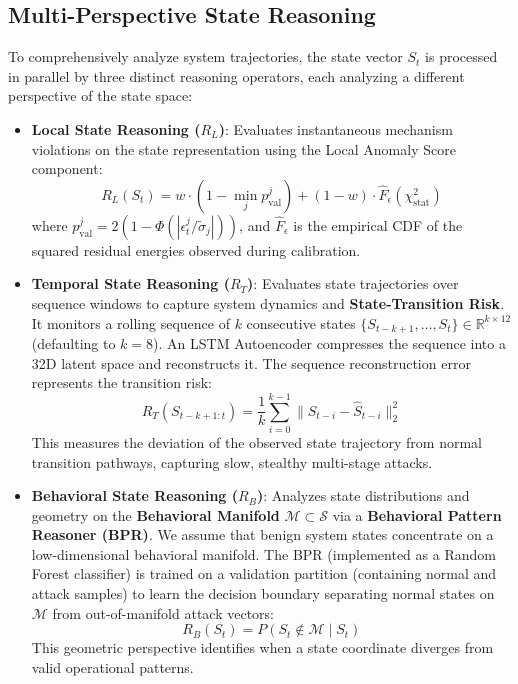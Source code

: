 \subsection{Multi-Perspective State Reasoning}
To comprehensively analyze system trajectories, the state vector $S_t$ is processed in parallel by three distinct reasoning operators, each analyzing a different perspective of the state space:
\begin{itemize}
\item \textbf{Local State Reasoning ($R_L$)}: Evaluates instantaneous mechanism violations on the state representation using the Local Anomaly Score component:
\begin{equation}
R_L(S_t) = w \cdot (1 - \min_j p_{\text{val}}^j) + (1-w) \cdot \hat{F}_{\epsilon}(\chi^2_{\text{stat}})
\end{equation}
where $p_{\text{val}}^j = 2(1 - \Phi(|\epsilon^j_t/\tilde{\sigma}_j|))$, and $\hat{F}_{\epsilon}$ is the empirical CDF of the squared residual energies observed during calibration.
\item \textbf{Temporal State Reasoning ($R_T$)}: Evaluates state trajectories over sequence windows to capture system dynamics and \textbf{State-Transition Risk}. It monitors a rolling sequence of $k$ consecutive states $\{S_{t-k+1}, \dots, S_t\} \in \mathbb{R}^{k \times 12}$ (defaulting to $k=8$). An LSTM Autoencoder compresses the sequence into a 32D latent space and reconstructs it. The sequence reconstruction error represents the transition risk:
\begin{equation}
R_T(S_{t-k+1:t}) = \frac{1}{k} \sum_{i=0}^{k-1} \|S_{t-i} - \hat{S}_{t-i}\|_2^2
\end{equation}
This measures the deviation of the observed state trajectory from normal transition pathways, capturing slow, stealthy multi-stage attacks.
\item \textbf{Behavioral State Reasoning ($R_B$)}: Analyzes state distributions and geometry on the \textbf{Behavioral Manifold} $\mathcal{M} \subset \mathcal{S}$ via a \textbf{Behavioral Pattern Reasoner (BPR)}. We assume that benign system states concentrate on a low-dimensional behavioral manifold. The BPR (implemented as a Random Forest classifier) is trained on a validation partition (containing normal and attack samples) to learn the decision boundary separating normal states on $\mathcal{M}$ from out-of-manifold attack vectors:
\begin{equation}
R_B(S_t) = P(S_t \notin \mathcal{M} \mid S_t)
\end{equation}
This geometric perspective identifies when a state coordinate diverges from valid operational patterns.
\end{itemize}

